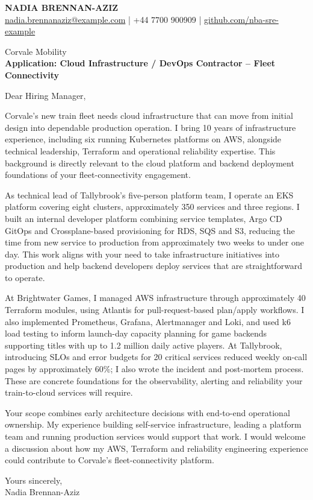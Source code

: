 \documentclass[11pt,a4paper]{article}
\begin{document}
{\Large\bfseries\color{primarycolor} NADIA BRENNAN-AZIZ}\\
{\small \href{mailto:nadia.brennanaziz@example.com}{nadia.brennanaziz@example.com} | +44 7700 900909 | \href{https://github.com/nba-sre-example}{github.com/nba-sre-example}}

Corvale Mobility\\
\textbf{Application: Cloud Infrastructure / DevOps Contractor -- Fleet Connectivity}

Dear Hiring Manager,

Corvale's new train fleet needs cloud infrastructure that can move from initial design into dependable production operation. I bring 10 years of infrastructure experience, including six running Kubernetes platforms on AWS, alongside technical leadership, Terraform and operational reliability expertise. This background is directly relevant to the cloud platform and backend deployment foundations of your fleet-connectivity engagement.

As technical lead of Tallybrook's five-person platform team, I operate an EKS platform covering eight clusters, approximately 350 services and three regions. I built an internal developer platform combining service templates, Argo CD GitOps and Crossplane-based provisioning for RDS, SQS and S3, reducing the time from new service to production from approximately two weeks to under one day. This work aligns with your need to take infrastructure initiatives into production and help backend developers deploy services that are straightforward to operate.

At Brightwater Games, I managed AWS infrastructure through approximately 40 Terraform modules, using Atlantis for pull-request-based plan/apply workflows. I also implemented Prometheus, Grafana, Alertmanager and Loki, and used k6 load testing to inform launch-day capacity planning for game backends supporting titles with up to 1.2 million daily active players. At Tallybrook, introducing SLOs and error budgets for 20 critical services reduced weekly on-call pages by approximately 60\%; I also wrote the incident and post-mortem process. These are concrete foundations for the observability, alerting and reliability your train-to-cloud services will require.

Your scope combines early architecture decisions with end-to-end operational ownership. My experience building self-service infrastructure, leading a platform team and running production services would support that work. I would welcome a discussion about how my AWS, Terraform and reliability engineering experience could contribute to Corvale's fleet-connectivity platform.

Yours sincerely,\\
Nadia Brennan-Aziz
\end{document}
